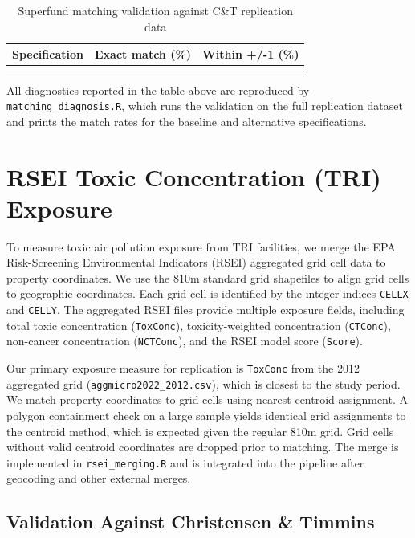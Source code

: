 \documentclass{article}
\begin{document}
\begin{table}[h]
\centering
\caption{Superfund matching validation against C\&T replication data}
\begin{tabular}{lrr}
\toprule
Specification & Exact match (\%) & Within +/-1 (\%) \\
\midrule
\\
\bottomrule
\end{tabular}
\end{table}

All diagnostics reported in the table above are reproduced by \texttt{matching\_diagnosis.R}, which runs the validation on the full replication dataset and prints the match rates for the baseline and alternative specifications.

\section{RSEI Toxic Concentration (TRI) Exposure}

To measure toxic air pollution exposure from TRI facilities, we merge the EPA Risk-Screening Environmental Indicators (RSEI) aggregated grid cell data to property coordinates. We use the 810m standard grid shapefiles to align grid cells to geographic coordinates. Each grid cell is identified by the integer indices \texttt{CELLX} and \texttt{CELLY}. The aggregated RSEI files provide multiple exposure fields, including total toxic concentration (\texttt{ToxConc}), toxicity-weighted concentration (\texttt{CTConc}), non-cancer concentration (\texttt{NCTConc}), and the RSEI model score (\texttt{Score}).

Our primary exposure measure for replication is \texttt{ToxConc} from the 2012 aggregated grid (\texttt{aggmicro2022\_2012.csv}), which is closest to the study period. We match property coordinates to grid cells using nearest-centroid assignment. A polygon containment check on a large sample yields identical grid assignments to the centroid method, which is expected given the regular 810m grid. Grid cells without valid centroid coordinates are dropped prior to matching. The merge is implemented in \texttt{rsei\_merging.R} and is integrated into the pipeline after geocoding and other external merges.

\subsection{Validation Against Christensen \& Timmins}
\end{document}
